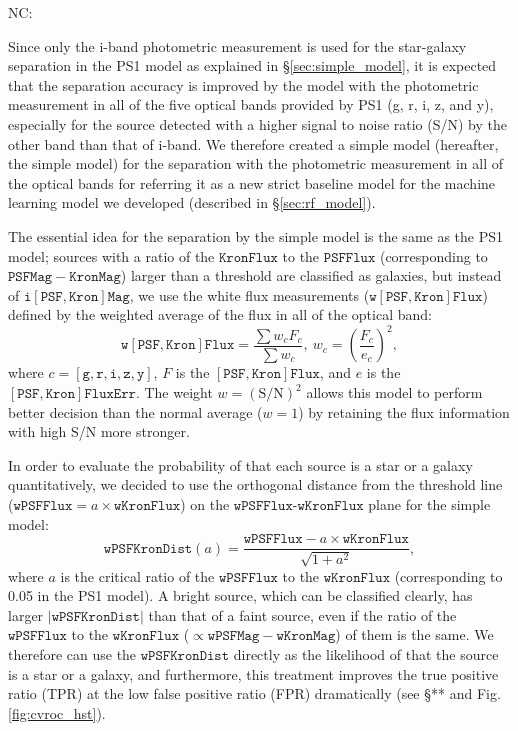 \documentclass[twocolumn]{aastex62}
\newcommand{\NC}[1]{{\color{brown} NC: {#1}}}
\begin{document}
\NC{
Since only the i-band photometric measurement is used for the star-galaxy separation  
in the PS1 model as explained in \S\ref{sec:simple_model},  
it is expected that the separation accuracy is improved 
by the model with the photometric measurement in all of the five optical bands 
provided by PS1 (g, r, i, z, and y), especially for the source 
detected with a higher signal to noise ratio (S/N) by the other band than that of i-band. 
We therefore created a simple model (hereafter, the simple model) for the separation 
with the photometric measurement in all of the optical bands 
for referring it as a new strict baseline model for the machine learning model  
we developed (described in \S\ref{sec:rf_model}).

The essential idea for the separation by the simple model is the same as the PS1 model;  
sources with a ratio of the $\mathtt{KronFlux}$ to the $\mathtt{PSFFlux}$ 
(corresponding to $\mathtt{PSFMag} - \mathtt{KronMag}$) larger than a threshold 
are classified as galaxies, 
but instead of $\mathtt{i[PSF, Kron]Mag}$,  
we use the white flux measurements ($\mathtt{w[PSF,Kron]Flux}$) 
defined by the weighted average of the flux in all of the optical band:   
$$
\mathtt{w[PSF, Kron]Flux} =  \frac{\sum w_c  F_c }{\sum w_c}, 
\ w_c = \left( \frac{F_c}{e_c} \right)^2, 
$$
where $c = [\mathtt{g, r, i, z, y}]$,  $F$ is the $\mathtt{[PSF,Kron]Flux}$, 
and $e$ is the $\mathtt{[PSF,Kron]FluxErr}$.  
The weight $w = \mathrm{(S/N)}^2$ allows this model to perform better decision 
than the normal average ($w = 1$) by retaining the flux information with high S/N more stronger. 

In order to evaluate the probability of that each source is a star or a galaxy quantitatively, 
we decided to use the orthogonal distance from the threshold line 
($\mathtt{wPSFFlux} = a\times \mathtt{wKronFlux}$) 
on the $\mathtt{wPSFFlux}$-$\mathtt{wKronFlux}$ plane for the simple model:  
$$
\mathtt{wPSFKronDist}(a) = 
	\frac{\mathtt{wPSFFlux} - a\times\mathtt{wKronFlux}}{ \sqrt{1 + a^2}}, 
$$
where $a$ is the critical ratio of the $\mathtt{wPSFFlux}$ to the $\mathtt{wKronFlux}$ 
(corresponding to 0.05 in the PS1 model). 
A bright source, which can be classified clearly, 
has larger $|\mathtt{wPSFKronDist}|$ than that of a faint source, 
even if the ratio of the $\mathtt{wPSFFlux}$ to the $\mathtt{wKronFlux} $
($\propto \mathtt{wPSFMag}  -  \mathtt{wKronMag}$) of them is the same. 
We therefore can use the $\mathtt{wPSFKronDist}$ directly 
as the likelihood of that the source is a star or a galaxy, 
and furthermore, this treatment improves the true positive ratio (TPR) 
at the low false positive ratio (FPR) dramatically (see \S*** and Fig.\ref{fig:cvroc_hst}). 

}
\end{document}
